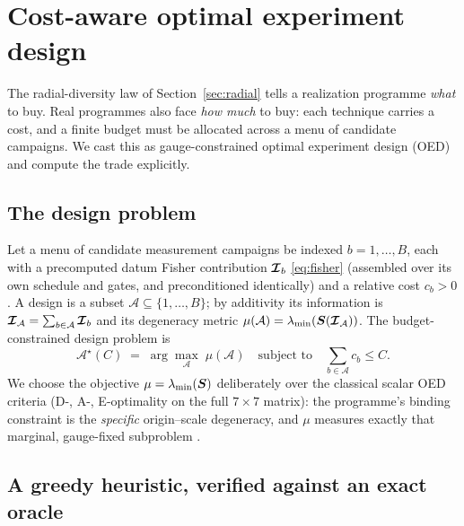 \section{Cost-aware optimal experiment design}
\label{sec:oed}

The radial-diversity law of Section~\ref{sec:radial} tells a realization programme
\emph{what} to buy. Real programmes also face \emph{how much} to buy: each
technique carries a cost, and a finite budget must be allocated across a menu of
candidate campaigns. We cast this as gauge-constrained optimal experiment design
(OED) and compute the trade explicitly.

\subsection{The design problem}
\label{sec:designproblem}

Let a menu of candidate measurement campaigns be indexed $b=1,\dots,B$, each with
a precomputed datum Fisher contribution $\bm{\mathcal{I}}_b$ \eqref{eq:fisher} (assembled
over its own schedule and gates, and preconditioned identically) and a relative
cost $c_b>0$. A design is a subset $\mathcal{A}\subseteq\{1,\dots,B\}$; by
additivity its information is $\bm{\mathcal{I}}_{\mathcal{A}}=\sum_{b\in\mathcal{A}}\bm{\mathcal{I}}_b$
and its degeneracy metric $\mu(\mathcal{A})=\lambda_{\min}(\bm{S}(\bm{\mathcal{I}}_{\mathcal{A}}))$.
The budget-constrained design problem is
\begin{equation}
  \mathcal{A}^\star(C) \;=\; \arg\max_{\mathcal{A}}\;
  \mu(\mathcal{A})
  \quad\text{subject to}\quad
  \sum_{b\in\mathcal{A}} c_b \le C.
  \label{eq:oed}
\end{equation}
We choose the objective $\mu=\lambda_{\min}(\bm{S})$ deliberately over the classical
scalar OED criteria (D-, A-, E-optimality on the full $7\times7$ matrix): the
programme's binding constraint is the \emph{specific} origin--scale degeneracy, and
$\mu$ measures exactly that marginal, gauge-fixed subproblem
\citep{pukelsheim2006oed}.

\subsection{A greedy heuristic, verified against an exact oracle}
\label{sec:greedy}

